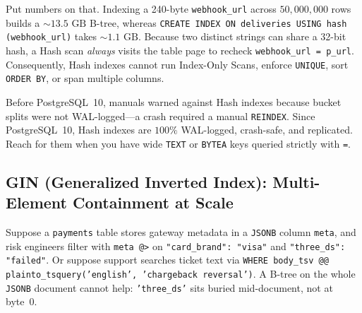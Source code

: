 Put numbers on that. Indexing a 240-byte \texttt{webhook\_url} across $50{,}000{,}000$ rows builds a $\sim 13.5\text{ GB}$ B-tree, whereas \texttt{CREATE INDEX ON deliveries USING hash (webhook\_url)} takes $\sim 1.1\text{ GB}$. Because two distinct strings can share a 32-bit hash, a Hash scan \emph{always} visits the table page to recheck \texttt{webhook\_url = p\_url}. Consequently, Hash indexes cannot run Index-Only Scans, enforce \texttt{UNIQUE}, sort \texttt{ORDER BY}, or span multiple columns.

\begin{marginnotebox}
Before PostgreSQL~10, manuals warned against Hash indexes because bucket splits were not WAL-logged---a crash required a manual \texttt{REINDEX}. Since PostgreSQL~10, Hash indexes are $100\%$ WAL-logged, crash-safe, and replicated. Reach for them when you have wide \texttt{TEXT} or \texttt{BYTEA} keys queried strictly with \texttt{=}.
\end{marginnotebox}

\subsection{GIN (Generalized Inverted Index): Multi-Element Containment at Scale}

Suppose a \texttt{payments} table stores gateway metadata in a \texttt{JSONB} column \texttt{meta}, and risk engineers filter with \texttt{meta @>} on \texttt{"card\_brand": "visa"} and \texttt{"three\_ds": "failed"}. Or suppose support searches ticket text via \texttt{WHERE body\_tsv @@ plainto\_tsquery('english', 'chargeback reversal')}. A B-tree on the whole \texttt{JSONB} document cannot help: \texttt{'three\_ds'} sits buried mid-document, not at byte~0.

